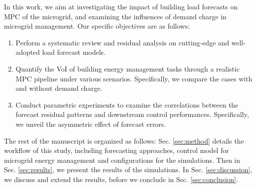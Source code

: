 In this work, we aim at investigating the impact of building load forecasts on MPC of the microgrid, and examining the influences of demand charge in microgrid management. Our specific objectives are as follows:
\begin{enumerate}
    \item Perform a systematic review and residual analysis on cutting-edge and well-adopted load forecast models.
    \item Quantify the VoI of building energy management tasks through a realistic MPC pipeline under various scenarios. Specifically, we compare the cases with and without demand charge.
    \item Conduct parametric experiments to examine the correlations between the forecast residual patterns and downstream control performances. Specifically, we unveil the asymmetric effect of forecast errors.
\end{enumerate}

The rest of the manuscript is organized as follows: Sec. \ref{sec:method} details the workflow of this study, including forecasting approaches, control model for microgrid energy management and configurations for the simulations. Then in Sec. \ref{sec:results}, we present the results of the simulations. In Sec. \ref{sec:discussion}, we discuss and extend the results, before we conclude in Sec. \ref{sec:conclusion}.



